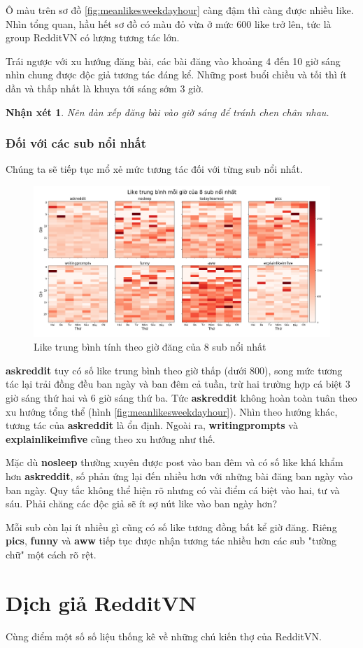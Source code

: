 \documentclass[10pt,a4paper]{article}
\newtheorem{remark}{Nhận xét}
\begin{document}
Ô màu trên sơ đồ \eqref{fig:meanlikesweekdayhour} càng đậm thì càng được nhiều like. Nhìn tổng quan, hầu hết sơ đồ có màu đỏ vừa ở mức 600 like trở lên, tức là group RedditVN có lượng tương tác lớn.

Trái ngược với xu hướng đăng bài, các bài đăng vào khoảng 4 đến 10 giờ sáng nhìn chung được độc giả tương tác đáng kể. Những post buổi chiều và tối thì ít dần và thấp nhất là khuya tới sáng sớm 3 giờ.

\begin{remark}
    \label{re:time}
    Nên dàn xếp đăng bài vào giờ sáng để tránh chen chân nhau.
\end{remark}
\subsubsection{Đối với các sub nổi nhất}
Chúng ta sẽ tiếp tục mổ xẻ mức tương tác đối với từng sub nổi nhất.
\begin{figure}[hb]
    \centering
    \includegraphics[width=\textwidth]{img/MeanLikesWeekdayHourPerSub.png}
    \caption{Like trung bình tính theo giờ đăng của 8 sub nổi nhất}
    \label{fig:meanlikesweekdayhourpersub}
\end{figure}
\textbf{askreddit} tuy có số like trung bình theo giờ thấp (dưới 800), song mức tương tác lại trải đồng đều ban ngày và ban đêm cả tuần, trừ hai trường hợp cá biệt 3 giờ sáng thứ hai và 6 giờ sáng thứ ba. Tức \textbf{askreddit} không hoàn toàn tuân theo xu hướng tổng thể (hình \eqref{fig:meanlikesweekdayhour}). Nhìn theo hướng khác, tương tác của \textbf{askreddit} là ổn định. Ngoài ra, \textbf{writingprompts} và \textbf{explainlikeimfive} cũng theo xu hướng như thế.

Mặc dù \textbf{nosleep} thường xuyên được post vào ban đêm và có số like khá khẩm hơn \textbf{askreddit}, số phản ứng lại đến nhiều hơn với những bài đăng ban ngày vào ban ngày. Quy tắc không thể hiện rõ nhưng có vài điểm cá biệt vào hai, tư và sáu. Phải chăng các độc giả sẽ ít sợ nút like vào ban ngày hơn?

Mỗi sub còn lại ít nhiều gì cũng có số like tương đồng bất kể giờ đăng. Riêng \textbf{pics}, \textbf{funny} và \textbf{aww} tiếp tục được nhận tương tác nhiều hơn các sub "tường chữ" một cách rõ rệt.

\section{Dịch giả RedditVN}
Cùng điểm một số số liệu thống kê về những chú kiến thợ của RedditVN.
\end{document}
